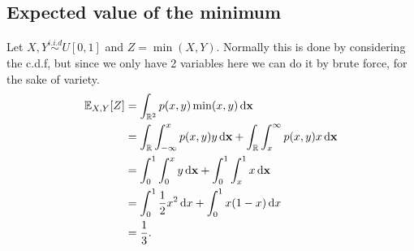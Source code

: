 \subsection{Expected value of the minimum}
Let $X,Y\overset{i.i.d}{\sim}U[0,1]$ and $Z = \min(X,Y)$. Normally this is done by considering the c.d.f, but since we only have 2 variables here we can do it by brute force, for the sake of variety.
\begin{align*}
\mathbb{E}_{X,Y}[Z] &= \int_{\mathbb{R}^2} p(x,y)\min(x,y) \mathop{}\!\mathrm{d}{\mathbf{x}}\\
&= \int_{\mathbb{R}} \int_{-\infty}^{x} p(x,y)y \mathop{}\!\mathrm{d}{\mathbf{x}} + \int_{\mathbb{R}} \int_{x}^{\infty} p(x,y)x \mathop{}\!\mathrm{d}{\mathbf{x}}\\
&= \int_{0}^{1} \int_{0}^{x} y \mathop{}\!\mathrm{d}{\mathbf{x}} + \int_{0}^{1} \int_{x}^{1} x \mathop{}\!\mathrm{d}{\mathbf{x}}\\
&= \int_{0}^{1} \frac{1}{2}x^2 \mathop{}\!\mathrm{d}{x} + \int_{0}^{1} x(1-x) \mathop{}\!\mathrm{d}{x}\\
&= \frac{1}{3}.
\end{align*}